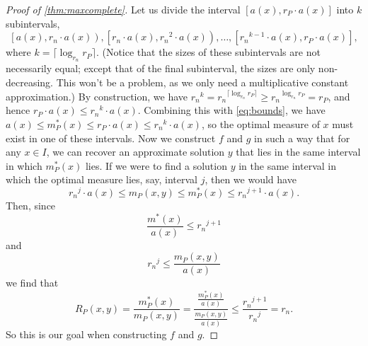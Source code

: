 \documentclass[]{article}
\theoremstyle{plain}
\theoremstyle{definition}
\newcommand{\ceil}[1]{\lceil{#1}\rceil}
\begin{document}
\begin{proof}[Proof of \autoref{thm:maxcomplete}]
  Let us divide the interval $[a(x), r_P \cdot a(x)]$ into $k$ subintervals,
  \begin{displaymath}
    \left[a(x), r_n \cdot a(x)\right), \left[r_n \cdot a(x), {r_n}^2 \cdot a(x)\right), \ldots, \left[{r_n}^{k - 1} \cdot a(x), r_P \cdot a(x)\right],
  \end{displaymath}
  where $k = \ceil{\log_{r_n}{r_P}}$.
  (Notice that the sizes of these subintervals are not necessarily equal; except that of the final subinterval, the sizes are only non-decreasing.
  This won't be a problem, as we only need a multiplicative constant approximation.)
  By construction, we have ${r_n}^k = {r_n}^{\ceil{\log_{r_n}{r_P}}} \geq {r_n}^{\log_{r_n}{r_P}} = r_P$, and hence $r_P \cdot a(x) \leq {r_n}^k \cdot a(x)$.
  Combining this with \autoref{eq:bounds}, we have $a(x) \leq m^*_P(x) \leq r_P \cdot a(x) \leq {r_n}^k \cdot a(x)$, so the optimal measure of $x$ must exist in one of these intervals.
  Now we construct $f$ and $g$ in such a way that for any $x \in I$, we can recover an approximate solution $y$ that lies in the same interval in which $m_P^*(x)$ lies.
  If we were to find a solution $y$ in the same interval in which the optimal measure lies, say, interval $j$, then we would have
  \begin{equation}\label{eq:subinterval}
    {r_n}^j \cdot a(x) \leq m_P(x, y) \leq m^*_P(x) \leq {r_n}^{j + 1} \cdot a(x).
  \end{equation}
  Then, since
  \begin{equation*}
    \frac{m^*(x)}{a(x)} \leq {r_n}^{j + 1}
  \end{equation*}
  and
  \begin{equation*}
    {r_n}^j \leq \frac{m_P(x, y)}{a(x)}
  \end{equation*}
  we find that
  \begin{equation}\label{eq:result}
    R_P(x, y) = \frac{m_P^*(x)}{m_P(x, y)} = \frac{\frac{m^*_P(x)}{a(x)}}{\frac{m_P(x, y)}{a(x)}} \leq \frac{{r_n}^{j + 1}}{{r_n}^j} = r_n.
  \end{equation}
  So this is our goal when constructing $f$ and $g$.


\end{proof}
\end{document}
